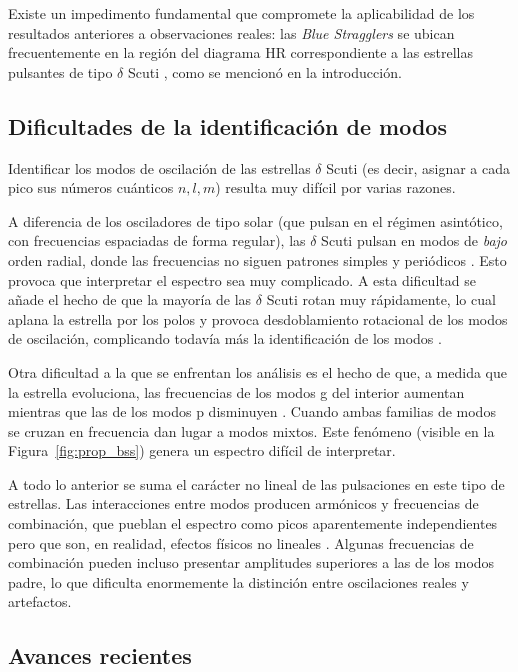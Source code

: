Existe un impedimento fundamental que compromete la aplicabilidad de los resultados anteriores a observaciones reales: las \textit{Blue Stragglers} se ubican frecuentemente en la región del diagrama HR correspondiente a las estrellas pulsantes de tipo $\delta$ Scuti \citep{Kurtz2022, 10.3389/fspas.2022.952296}, como se mencionó en la introducción.

\subsection{Dificultades de la identificación de modos}

Identificar los modos de oscilación de las estrellas $\delta$ Scuti (es decir, asignar a cada pico sus números cuánticos $n,l,m$) resulta muy difícil por varias razones.

A diferencia de los osciladores de tipo solar (que pulsan en el régimen asintótico, con frecuencias espaciadas de forma regular), las $\delta$ Scuti pulsan en modos de \textit{bajo} orden radial, donde las frecuencias no siguen patrones simples y periódicos \citep{Handler_2009,Gatuam_2026}. Esto provoca que interpretar el espectro sea muy complicado. A esta dificultad se añade el hecho de que la mayoría de las $\delta$ Scuti rotan muy rápidamente, lo cual aplana la estrella por los polos y provoca desdoblamiento rotacional de los modos de oscilación, complicando todavía más la identificación de los modos \citep{10.3389/fspas.2022.952296}.

Otra dificultad a la que se enfrentan los análisis es el hecho de que, a medida que la estrella evoluciona, las frecuencias de los modos g del interior aumentan mientras que las de los modos p disminuyen \citep{Handler_2009}. Cuando ambas familias de modos se cruzan en frecuencia dan lugar a modos mixtos. Este fenómeno (visible en la Figura~\ref{fig:prop_bss}) genera un espectro difícil de interpretar.

A todo lo anterior se suma el carácter no lineal de las pulsaciones en este tipo de estrellas. Las interacciones entre modos producen armónicos y frecuencias de combinación, que pueblan el espectro como picos aparentemente independientes pero que son, en realidad, efectos físicos no lineales \citep{LaresMartiz2021}. Algunas frecuencias de combinación pueden incluso presentar amplitudes superiores a las de los modos padre, lo que dificulta enormemente la distinción entre oscilaciones reales y artefactos.

\subsection{Avances recientes}

